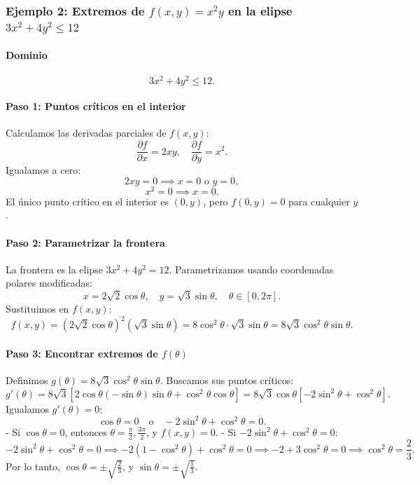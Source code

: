 \documentclass[11pt]{book}
\theoremstyle{definicion}
\theoremstyle{teorema}
\theoremstyle{ejemplo}
\begin{document}



\subsubsection*{Ejemplo 2: Extremos de \( f(x, y) = x^2 y \) en la elipse \( 3x^2 + 4y^2 \leq 12 \)}

\paragraph*{Dominio}
\[
3x^2 + 4y^2 \leq 12.
\]

\paragraph*{Paso 1: Puntos críticos en el interior}

Calculamos las derivadas parciales de \( f(x, y) \):
\[
\frac{\partial f}{\partial x} = 2xy, \quad \frac{\partial f}{\partial y} = x^2.
\]
Igualamos a cero:
\[
2xy = 0 \implies x = 0 \text{ o } y = 0,
\]
\[
x^2 = 0 \implies x = 0.
\]
El único punto crítico en el interior es \( (0, y) \), pero \( f(0, y) = 0 \) para cualquier \( y \).

\paragraph*{Paso 2: Parametrizar la frontera}

La frontera es la elipse \( 3x^2 + 4y^2 = 12 \). Parametrizamos usando coordenadas polares modificadas:
\[
x = 2\sqrt{2} \cos \theta, \quad y = \sqrt{3} \sin \theta, \quad \theta \in [0, 2\pi].
\]
Sustituimos en \( f(x, y) \):
\[
f(x, y) = (2\sqrt{2} \cos \theta)^2 (\sqrt{3} \sin \theta) = 8 \cos^2 \theta \cdot \sqrt{3} \sin \theta = 8\sqrt{3} \cos^2 \theta \sin \theta.
\]

\paragraph*{Paso 3: Encontrar extremos de \( f(\theta) \)}

Definimos \( g(\theta) = 8\sqrt{3} \cos^2 \theta \sin \theta \). Buscamos sus puntos críticos:
\[
g'(\theta) = 8\sqrt{3} [2 \cos \theta (-\sin \theta) \sin \theta + \cos^2 \theta \cos \theta] = 8\sqrt{3} \cos \theta [ -2 \sin^2 \theta + \cos^2 \theta ].
\]
Igualamos \( g'(\theta) = 0 \):
\[
\cos \theta = 0 \quad \text{o} \quad -2 \sin^2 \theta + \cos^2 \theta = 0.
\]
- Si \( \cos \theta = 0 \), entonces \( \theta = \frac{\pi}{2}, \frac{3\pi}{2} \), y \( f(x, y) = 0 \).
- Si \( -2 \sin^2 \theta + \cos^2 \theta = 0 \):
  \[
  -2 \sin^2 \theta + \cos^2 \theta = 0 \implies -2(1 - \cos^2 \theta) + \cos^2 \theta = 0 \implies -2 + 3\cos^2 \theta = 0 \implies \cos^2 \theta = \frac{2}{3}.
  \]
  Por lo tanto, \( \cos \theta = \pm \sqrt{\frac{2}{3}} \), y \( \sin \theta = \pm \sqrt{\frac{1}{3}} \).
\end{document}
